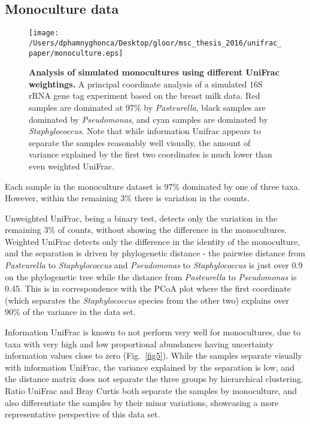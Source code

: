 \documentclass[10pt,letterpaper]{article}
\begin{document}
\FloatBarrier

\subsection{Monoculture data}

\begin{figure}[h]
\texttt{[image: /Users/dphamnyghonca/Desktop/gloor/msc\_thesis\_2016/unifrac\_paper/monoculture.eps]}
\caption[Analysis of simulated monocultures using different UniFrac weightings.]{{\bf Analysis of simulated monocultures using different UniFrac weightings. }
A principal coordinate analysis of a simulated 16S rRNA gene tag experiment based on the breast milk data. Red samples are dominated at 97\% by \textit{Pasteurella}, black samples are dominated by \textit{Pseudomonas}, and cyan samples are dominated by \textit{Staphylococcus}. Note that while information Unifrac appears to separate the samples reasonably well visually, the amount of variance explained by the first two coordinates is much lower than even weighted UniFrac.}
\label{fig8}
\end{figure}

Each sample in the monoculture dataset is 97\% dominated by one of three taxa. However, within the remaining 3\% there is variation in the counts.

Unweighted UniFrac, being a binary test, detects only the variation in the remaining 3\% of counts, without showing the difference in the monocultures. Weighted UniFrac detects only the difference in the identity of the monoculture, and the separation is driven by phylogenetic distance - the pairwise distance from \textit{Pasteurella} to \textit{Staphylococcus} and \textit{Pseudomonas} to \textit{Staphylococcus} is just over 0.9 on the phylogenetic tree while the distance from \textit{Pasteurella} to \textit{Pseudomonas} is 0.45. This is in correspondence with the PCoA plot where the first coordinate (which separates the \textit{Staphylococcus} species from the other two) explains over 90\% of the variance in the data set.

Information UniFrac is known to not perform very well for monocultures, due to taxa with very high and low proportional abundances having uncertainty information values close to zero (Fig.~\ref{fig5}). While the samples separate visually with information UniFrac, the variance explained by the separation is low, and the distance matrix does not separate the three groups by hierarchical clustering. Ratio UniFrac and Bray Curtis both separate the samples by monoculture, and also differentiate the samples by their minor variations, showcasing a more representative perspective of this data set.
\end{document}
